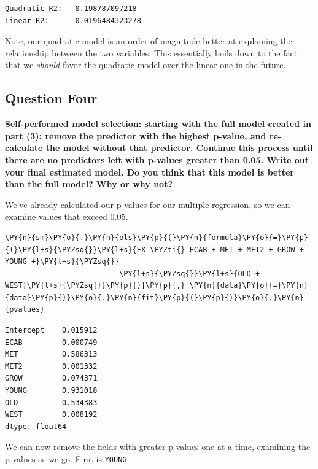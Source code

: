 \documentclass[10pt]{article}\usepackage[]{graphicx}\usepackage[]{xcolor}
\begin{document}
    \begin{Verbatim}[commandchars=\\\{\}]
Quadratic R2:   0.198787097218
Linear R2:     -0.0196484323278
    \end{Verbatim}

    Note, our quadratic model is an order of magnitude better at explaining the relationship between the two variables.
    This essentially boils down to the fact that we \emph{should} favor the quadratic model over the linear one in the
    future.

    \subsection*{Question Four}
    \textbf{Self-performed model selection: starting with the full model created in part (3): remove the predictor with
    the highest p-value, and re-calculate the model without that predictor. Continue this process until there are no
    predictors left with p-values greater than 0.05. Write out your final estimated model. Do you think that this model
    is better than the full model? Why or why not?}\newline

    We've already calculated our p-values for our multiple regression, so we can examine values that exceed 0.05.

    \begin{Verbatim}[commandchars=\\\{\}]
 \PY{n}{sm}\PY{o}{.}\PY{n}{ols}\PY{p}{(}\PY{n}{formula}\PY{o}{=}\PY{p}{(}\PY{l+s}{\PYZsq{}}\PY{l+s}{EX \PYZti{} ECAB + MET + MET2 + GROW + YOUNG +}\PY{l+s}{\PYZsq{}}
                          \PY{l+s}{\PYZsq{}}\PY{l+s}{OLD + WEST}\PY{l+s}{\PYZsq{}}\PY{p}{)}\PY{p}{,} \PY{n}{data}\PY{o}{=}\PY{n}{data}\PY{p}{)}\PY{o}{.}\PY{n}{fit}\PY{p}{(}\PY{p}{)}\PY{o}{.}\PY{n}{pvalues}
\end{Verbatim}

            \begin{Verbatim}[commandchars=\\\{\}]
Intercept    0.015912
ECAB         0.000749
MET          0.586313
MET2         0.001332
GROW         0.074371
YOUNG        0.931018
OLD          0.534383
WEST         0.008192
dtype: float64
\end{Verbatim}
        
    We can now remove the fields with greater p-values one at a time, examining the p-values as we go. First is
    \texttt{YOUNG}.
\end{document}
